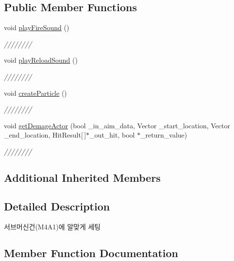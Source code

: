 \subsection*{Public Member Functions}
\begin{DoxyCompactItemize}
\item 
void \hyperlink{class_m4_a1___weapons_a400f64b923b0d32f08835be2d53abeb2}{play\+Fire\+Sound} ()
\begin{DoxyCompactList}\small\item\em //////// \end{DoxyCompactList}\item 
void \hyperlink{class_m4_a1___weapons_a486c1ee92e90fc290706e2a242e685f0}{play\+Reload\+Sound} ()
\begin{DoxyCompactList}\small\item\em //////// \end{DoxyCompactList}\item 
void \hyperlink{class_m4_a1___weapons_a6d0fd5e88a323209a701854cf0542c71}{create\+Particle} ()
\begin{DoxyCompactList}\small\item\em //////// \end{DoxyCompactList}\item 
void \hyperlink{class_m4_a1___weapons_a01956bfd99d0556e70af95d7862ee247}{get\+Demage\+Actor} (bool \+\_\+in\+\_\+aim\+\_\+data, Vector \+\_\+start\+\_\+location, Vector \+\_\+end\+\_\+location, Hit\+Result\mbox{[}$\,$\mbox{]}$\ast$\+\_\+out\+\_\+hit, bool $\ast$\+\_\+return\+\_\+value)
\begin{DoxyCompactList}\small\item\em //////// \end{DoxyCompactList}\end{DoxyCompactItemize}
\subsection*{Additional Inherited Members}


\subsection{Detailed Description}
서브머신건(\+M4\+A1)에 알맞게 세팅 

\subsection{Member Function Documentation}
